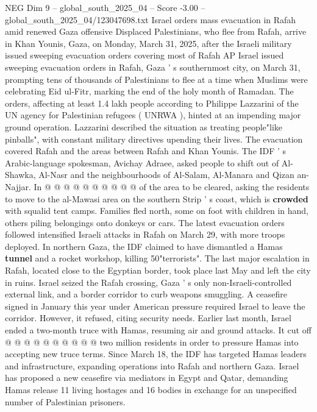 \begin{textsample}{NEG Dim 9 – global\_south\_2025\_04 – Score -3.00 – global\_south\_2025\_04/123047698.txt}  \label{ex:f9_neg_299}
Israel orders mass evacuation in Rafah amid renewed Gaza offensive Displaced Palestinians, who flee from Rafah, arrive in Khan Younis, Gaza, on Monday, March 31, 2025, after the Israeli military issued sweeping evacuation orders covering most of Rafah AP Israel issued sweeping evacuation orders in Rafah, Gaza ' s southernmost city, on March 31, prompting tens of thousands of Palestinians to flee at a time when Muslims were celebrating Eid ul-Fitr, marking the end of the holy month of Ramadan.
The orders, affecting at least 1.4 lakh people according to Philippe Lazzarini of the UN agency for Palestinian refugees ( UNRWA ), hinted at an impending major ground operation.
Lazzarini described the situation as treating people"like pinballs", with constant military directives upending their lives.
The evacuation covered Rafah and the areas between Rafah and Khan Younis.
The IDF ' s Arabic-language spokesman, Avichay Adraee, asked people to shift out of Al-Shawka, Al-Nasr and the neighbourhoods of Al-Salam, Al-Manara and Qizan an-Najjar.
In @ @ @ @ @ @ @ @ @ @ of the area to be cleared, asking the residents to move to the al-Mawasi area on the southern Strip ' s coast, which is \textbf{crowded} with squalid tent camps.
Families fled north, some on foot with children in hand, others piling belongings onto donkeys or cars.
The latest evacuation orders followed intensified Israeli attacks in Rafah on March 29, with more troops deployed.
In northern Gaza, the IDF claimed to have dismantled a Hamas \textbf{tunnel} and a rocket workshop, killing 50"terrorists".
The last major escalation in Rafah, located close to the Egyptian border, took place last May and left the city in ruins.
Israel seized the Rafah crossing, Gaza ' s only non-Israeli-controlled external link, and a border corridor to curb weapons smuggling.
A ceasefire signed in January this year under American pressure required Israel to leave the corridor.
However, it refused, citing security needs.
Earlier last month, Israel ended a two-month truce with Hamas, resuming air and ground attacks.
It cut off @ @ @ @ @ @ @ @ @ @ two million residents in order to pressure Hamas into accepting new truce terms.
Since March 18, the IDF has targeted Hamas leaders and infrastructure, expanding operations into Rafah and northern Gaza.
Israel has proposed a new ceasefire via mediators in Egypt and Qatar, demanding Hamas release 11 living hostages and 16 bodies in exchange for an unspecified number of Palestinian prisoners.

\end{textsample}
